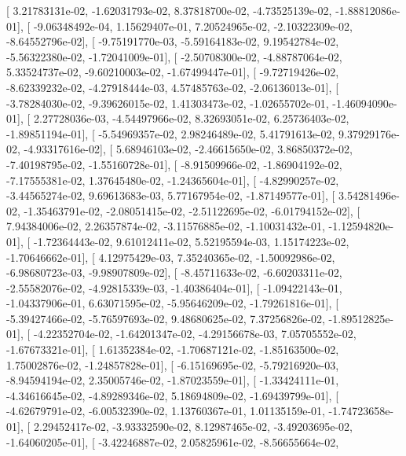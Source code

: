 \documentclass{article}
\begin{document}
       [  3.21783131e-02,  -1.62031793e-02,   8.37818700e-02,
         -4.73525139e-02,  -1.88812086e-01],
       [ -9.06348492e-04,   1.15629407e-01,   7.20524965e-02,
         -2.10322309e-02,  -8.64552796e-02],
       [ -9.75191770e-03,  -5.59164183e-02,   9.19542784e-02,
         -5.56322380e-02,  -1.72041009e-01],
       [ -2.50708300e-02,  -4.88787064e-02,   5.33524737e-02,
         -9.60210003e-02,  -1.67499447e-01],
       [ -9.72719426e-02,  -8.62339232e-02,  -4.27918444e-03,
          4.57485763e-02,  -2.06136013e-01],
       [ -3.78284030e-02,  -9.39626015e-02,   1.41303473e-02,
         -1.02655702e-01,  -1.46094090e-01],
       [  2.27728036e-03,  -4.54497966e-02,   8.32693051e-02,
          6.25736403e-02,  -1.89851194e-01],
       [ -5.54969357e-02,   2.98246489e-02,   5.41791613e-02,
          9.37929176e-02,  -4.93317616e-02],
       [  5.68946103e-02,  -2.46615650e-02,   3.86850372e-02,
         -7.40198795e-02,  -1.55160728e-01],
       [ -8.91509966e-02,  -1.86904192e-02,  -7.17555381e-02,
          1.37645480e-02,  -1.24365604e-01],
       [ -4.82990257e-02,  -3.44565274e-02,   9.69613683e-03,
          5.77167954e-02,  -1.87149577e-01],
       [  3.54281496e-02,  -1.35463791e-02,  -2.08051415e-02,
         -2.51122695e-02,  -6.01794152e-02],
       [  7.94384006e-02,   2.26357874e-02,  -3.11576885e-02,
         -1.10031432e-01,  -1.12594820e-01],
       [ -1.72364443e-02,   9.61012411e-02,   5.52195594e-03,
          1.15174223e-02,  -1.70646662e-01],
       [  4.12975429e-03,   7.35240365e-02,  -1.50092986e-02,
         -6.98680723e-03,  -9.98907809e-02],
       [ -8.45711633e-02,  -6.60203311e-02,  -2.55582076e-02,
         -4.92815339e-03,  -1.40386404e-01],
       [ -1.09422143e-01,  -1.04337906e-01,   6.63071595e-02,
         -5.95646209e-02,  -1.79261816e-01],
       [ -5.39427466e-02,  -5.76597693e-02,   9.48680625e-02,
          7.37256826e-02,  -1.89512825e-01],
       [ -4.22352704e-02,  -1.64201347e-02,  -4.29156678e-03,
          7.05705552e-02,  -1.67673321e-01],
       [  1.61352384e-02,  -1.70687121e-02,  -1.85163500e-02,
          1.75002876e-02,  -1.24857828e-01],
       [ -6.15169695e-02,  -5.79216920e-03,  -8.94594194e-02,
          2.35005746e-02,  -1.87023559e-01],
       [ -1.33424111e-01,  -4.34616645e-02,  -4.89289346e-02,
          5.18694809e-02,  -1.69439799e-01],
       [ -4.62679791e-02,  -6.00532390e-02,   1.13760367e-01,
          1.01135159e-01,  -1.74723658e-01],
       [  2.29452417e-02,  -3.93332590e-02,   8.12987465e-02,
         -3.49203695e-02,  -1.64060205e-01],
       [ -3.42246887e-02,   2.05825961e-02,  -8.56655664e-02,
\end{document}
